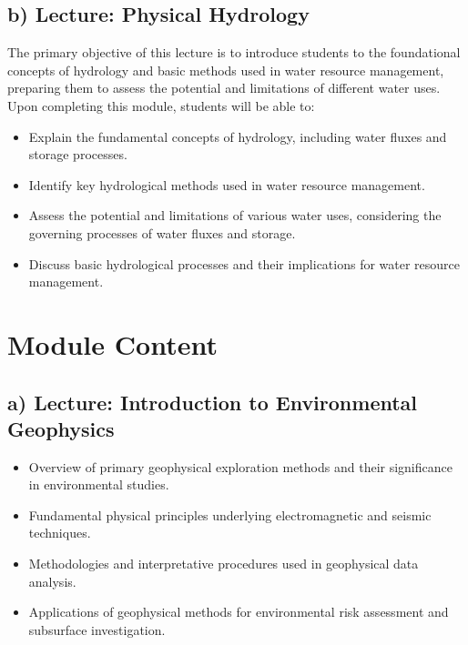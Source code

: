 \documentclass[
  letterpaper,
  10pt,
  openany]{book}
\providecommand{\tightlist}{%
  \setlength{\itemsep}{0pt}\setlength{\parskip}{0pt}}\usepackage{longtable,booktabs,array}
\begin{document}
\subsection*{b) Lecture: Physical
Hydrology}\label{b-lecture-physical-hydrology}

The primary objective of this lecture is to introduce students to the
foundational concepts of hydrology and basic methods used in water
resource management, preparing them to assess the potential and
limitations of different water uses. Upon completing this module,
students will be able to:

\begin{itemize}
\tightlist
\item
  Explain the fundamental concepts of hydrology, including water fluxes
  and storage processes.
\item
  Identify key hydrological methods used in water resource management.
\item
  Assess the potential and limitations of various water uses,
  considering the governing processes of water fluxes and storage.
\item
  Discuss basic hydrological processes and their implications for water
  resource management.
\end{itemize}

\section*{Module Content}\label{module-content}


\subsection*{a) Lecture: Introduction to Environmental
Geophysics}\label{a-lecture-introduction-to-environmental-geophysics-1}

\begin{itemize}
\tightlist
\item
  Overview of primary geophysical exploration methods and their
  significance in environmental studies.
\item
  Fundamental physical principles underlying electromagnetic and seismic
  techniques.
\item
  Methodologies and interpretative procedures used in geophysical data
  analysis.
\item
  Applications of geophysical methods for environmental risk assessment
  and subsurface investigation.
\end{itemize}
\end{document}
